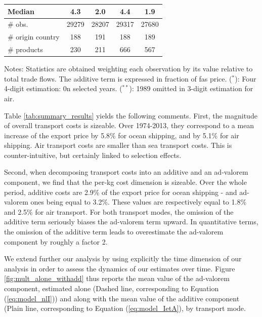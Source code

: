 \documentclass[a4paper,11pt]{article}
\begin{document}
\begin{table}[htbp]
{\begin{center}
\begin{tabular}{l|cc|cc}
        Median & 4.3 & 2.0 & 4.4& 1.9 \\ \hline
        \# obs. & 29279 & 28207 & 29317 & 27680 \\
    \# origin country & 188 & 191 & 188 & 189 \\
    \# products & 230 & 211 & 666 & 567 \\  \hline \hline
  \end{tabular}
    \end{center}}
\parbox[l]{10cm}{\tiny{Notes: Statistics are obtained weighting each observation by its value relative to total trade flows. The additive term is expressed in fraction of fas price. ($^\ast$): Four 4-digit estimation: 0n selected years. ($^{\ast \ast}$): 1989 omitted in 3-digit estimation for air.}}
\end{table}%


Table \ref{tab:summary_results} yields the following comments. First, the magnitude of overall transport costs is sizeable. Over 1974-2013, they correspond to a mean increase of the export price by 5.8\% for ocean shipping, and by 5.1\% for air shipping. Air transport costs are smaller than sea transport costs. This is counter-intuitive, but certainly linked to selection effects.



Second, when decomposing transport costs into an additive and an ad-valorem component, we find that the per-kg cost dimension is sizeable. Over the whole period, additive costs are 2.9\% of the export price for ocean shipping  - and ad-valorem ones being equal to 3.2\%. These values are respectively equal to 1.8\% and 2.5\% for air transport. For both transport modes, the omission of the additive term seriously biases the ad-valorem term upward. In quantitative terms, the omission of the additive term leads to overestimate the ad-valorem component by roughly a factor 2.

We extend further our analysis by using explicitly the time dimension of our analysis in order to assess the dynamics of our estimates over time. Figure \ref{fig:mult_alone_withadd} thus reports the mean value of the ad-valorem component, estimated alone (Dashed line, corresponding to Equation (\ref{eq:model_nlI})) and along with the mean value of the additive component (Plain line, corresponding to Equation (\ref{eq:model_IetA}), by transport mode.
\end{document}
